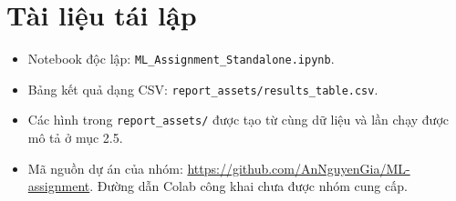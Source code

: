 \documentclass[conference,a4paper]{IEEEtran}
\begin{document}
\section*{Tài liệu tái lập}


\begin{itemize}[leftmargin=*]
    \item Notebook độc lập: \texttt{ML\_Assignment\_Standalone.ipynb}.
    \item Bảng kết quả dạng CSV: \texttt{report\_assets/results\_table.csv}.
    \item Các hình trong \texttt{report\_assets/} được tạo từ cùng dữ liệu và lần chạy được mô tả ở mục 2.5.
    \item Mã nguồn dự án của nhóm: \url{https://github.com/AnNguyenGia/ML-assignment}. Đường dẫn Colab công khai chưa được nhóm cung cấp.
\end{itemize}
\end{document}
